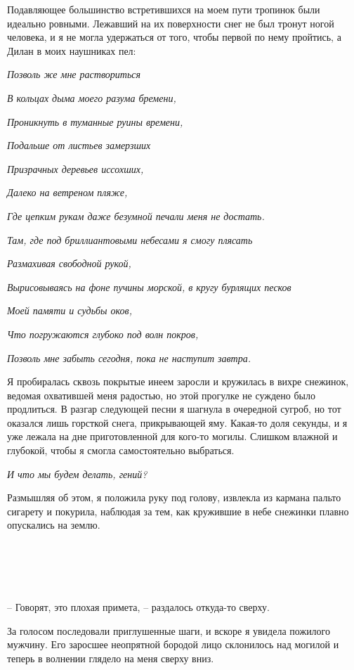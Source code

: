 \documentclass[
]{book}
\begin{document}
Подавляющее большинство встретившихся на моем пути тропинок были идеально ровными. Лежавший на их поверхности снег не был тронут ногой человека, и я не могла удержаться от того, чтобы первой по нему пройтись, а Дилан в моих наушниках пел:

\emph{Позволь же мне раствориться}

\emph{В кольцах дыма моего разума бремени,}

\emph{Проникнуть в туманные руины времени,}

\emph{Подальше от листьев замерзших}

\emph{Призрачных деревьев иссохших,}

\emph{Далеко на ветреном пляже,}

\emph{Где цепким рукам даже безумной печали меня не достать.}

\emph{Там, где под бриллиантовыми небесами я смогу плясать}

\emph{Размахивая свободной рукой,}

\emph{Вырисовываясь на фоне пучины морской, в кругу бурлящих песков}

\emph{Моей памяти и судьбы оков,}

\emph{Что погружаются глубоко под волн покров,}

\emph{Позволь мне забыть сегодня, пока не наступит завтра.}

Я пробиралась сквозь покрытые инеем заросли и кружилась в вихре снежинок, ведомая охватившей меня радостью, но этой прогулке не суждено было продлиться. В разгар следующей песни я шагнула в очередной сугроб, но тот оказался лишь горсткой снега, прикрывающей яму. Какая-то доля секунды, и я уже лежала на дне приготовленной для кого-то могилы. Слишком влажной и глубокой, чтобы я смогла самостоятельно выбраться.

\emph{И что мы будем делать, гений?}

Размышляя об этом, я положила руку под голову, извлекла из кармана пальто сигарету и покурила, наблюдая за тем, как кружившие в небе снежинки плавно опускались на землю.

\hypertarget{chapter-83}{%
\chapter{~}\label{chapter-83}}

-- Говорят, это плохая примета, -- раздалось откуда-то сверху.

За голосом последовали приглушенные шаги, и вскоре я увидела пожилого мужчину. Его заросшее неопрятной бородой лицо склонилось над могилой и теперь в волнении глядело на меня сверху вниз.
\end{document}
